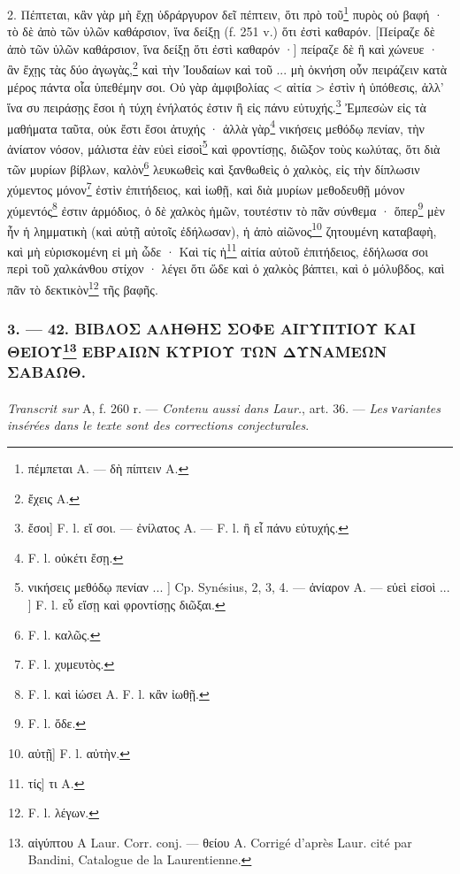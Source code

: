 \documentclass[landscape, a4paper, 11pt, oneside, polutonikogreek, french]{article}
\begin{document}
2. Πέπτεται, κἂν γὰρ μὴ ἔχῃ ὑδράργυρον δεῖ πέπτειν, ὅτι πρὸ τοῦ\footnote{πέμπεται A. --- δὴ πίπτειν A.} πυρὸς οὐ βαφή · τὸ δὲ ἀπὸ τῶν ὑλῶν καθάρσιον, ἵνα δείξῃ (f. 251 v.) ὅτι ἐστὶ καθαρόν. [Πείραζε δὲ ἀπὸ τῶν ὑλῶν καθάρσιον, ἵνα δείξῃ ὅτι ἐστὶ καθαρόν ·] πείραζε δὲ ἢ καὶ χώνευε · ἂν ἔχῃς τὰς δύο ἀγωγὰς,\footnote{ἔχεις A.} καὶ τὴν Ἰουδαίων καὶ τοῦ ... μὴ ὀκνήση οὖν πειράζειν κατὰ μέρος πάντα οἷα ὑπεθέμην σοι. Οὐ γὰρ ἀμφιβολίας < αἰτία > ἐστὶν ἡ ὑπόθεσις, ἀλλ' ἵνα συ πειράσῃς ἔσοι ἡ τύχη ἐνήλατός ἐστιν ἢ εἰς πάνυ εὐτυχής.\footnote{ἔσοι] F. l. εἴ σοι. --- ἐνίλατος A. --- F. l. ἢ εἶ πάνυ εὐτυχής.} Ἐμπεσὼν εἰς τὰ μαθήματα ταῦτα, οὐκ ἔστι ἔσοι ἀτυχής · ἀλλὰ γὰρ\footnote{F. l. οὐκέτι ἔσῃ.} νικήσεις μεθόδῳ πενίαν, τὴν ἀνίατον νόσον, μάλιστα ἐὰν εὐεὶ εἰσοὶ\footnote{νικήσεις μεθόδῳ πενίαν ... ] Cp. Synésius, 2, 3, 4. --- ἀνίαρον A. --- εὐεὶ εἰσοὶ ... ] F. l. εὗ εἴσῃ καὶ φροντίσῃς διῶξαι.} καὶ φροντίσῃς, διῶξον τοὺς κωλύτας, ὅτι διὰ τῶν μυρίων βίβλων, καλὸν\footnote{F. l. καλῶς.} λευκωθεὶς καὶ ξανθωθεὶς ὁ χαλκὸς, εἰς τὴν δίπλωσιν χύμεντος μόνον\footnote{F. l. χυμευτὸς.} ἐστὶν ἐπιτήδειος, καὶ ἰωθῇ, καὶ διὰ μυρίων μεθοδευθῇ μόνον χύμεντός\footnote{F. l. καὶ ἰώσει A. F. l. κἂν ἰωθῇ.} ἐστιν ἁρμόδιος, ὁ δὲ χαλκὸς ἡμῶν, τουτέστιν τὸ πᾶν σύνθεμα · ὅπερ\footnote{F. l. ὅδε.} μὲν ἦν ἡ λημματικὴ (καὶ αὐτῇ αὐτοῖς ἐδήλωσαν), ἡ ἀπὸ αἰῶνος\footnote{αὐτῇ] F. l. αὐτὴν.} ζητουμένη καταβαφὴ, καὶ μὴ εὑρισκομένη εἰ μὴ ὧδε · Καὶ τίς ἡ\footnote{τίς] τι A.} αἰτία αὐτοῦ ἐπιτήδειος, ἐδήλωσα σοι περὶ τοῦ χαλκάνθου στίχον · λέγει ὅτι ὥδε καὶ ὁ χαλκὸς βάπτει, καὶ ὁ μόλυβδος, καὶ πᾶν τὸ δεκτικὸν\footnote{F. l. λέγων.} τῆς βαφῆς.

\bigskip
\centerline{\EightStarTaper}
\centerline{\EightStarTaper\EightStarTaper}
\bigskip

\subsubsection[3. --- 42. ΒΙΒΛΟΣ ΑΛΗΘΗΣ ΣΟΦΕ ΑΙΓΥΠΤΙΟΥ ΚΑΙ ΘΕΙΟΥ ΕΒΡΑΙΩΝ ΚΥΡΙΟΥ ΤΩΝ ΔΥΝΑΜΕΩΝ ΣΑΒΑΩΘ.]{3. --- 42. ΒΙΒΛΟΣ ΑΛΗΘΗΣ ΣΟΦΕ ΑΙΓΥΠΤΙΟΥ ΚΑΙ ΘΕΙΟΥ\footnote{αἰγύπτου A Laur. Corr. conj. --- θείου A. Corrigé d'après Laur. cité par Bandini, Catalogue de la Laurentienne.} ΕΒΡΑΙΩΝ ΚΥΡΙΟΥ ΤΩΝ ΔΥΝΑΜΕΩΝ ΣΑΒΑΩΘ.}
\paragraph{}
\emph{Transcrit sur} A, f. 260 r. --- \emph{Contenu aussi dans Laur.}, art. 36. --- \emph{Les νariantes insérées dans le texte sont des corrections conjecturales}.
\end{document}

